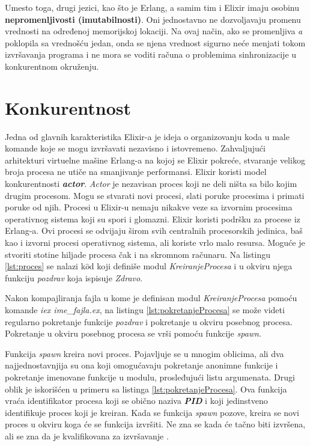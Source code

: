 \documentclass[12pt,oneside]{memoir}
\begin{document}
Umesto toga, drugi jezici, kao što je Erlang, a samim tim i Elixir imaju osobinu \textbf{nepromenljivosti (imutabilnosti)}. Oni jednostavno ne dozvoljavaju promenu vrednosti na određenoj memorijskoj lokaciji. Na ovaj način, ako se promenljiva \textit{a} poklopila sa vrednošću jedan, onda se njena vrednost sigurno neće menjati tokom izvršavanja programa i ne mora se voditi računa o problemima sinhronizacije u konkurentnom okruženju.

\section{Konkurentnost}

Jedna od glavnih karakteristika Elixir-a je ideja o organizovanju koda u male komande koje se mogu izvršavati nezavisno i istovremeno. Zahvaljujući arhitekturi virtuelne mašine Erlang-a na kojoj se Elixir pokreće, stvaranje velikog broja procesa ne utiče na smanjivanje performansi. Elixir koristi model konkurentnosti \textit{\textbf{actor}}. \textit{Actor} je nezavisan proces koji ne deli ništa sa bilo kojim drugim procesom. Mogu se stvarati novi procesi, slati poruke procesima i primati poruke od njih. Procesi u Elixir-u nemaju nikakve veze sa izvornim procesima operativnog sistema koji su spori i glomazni. Elixir koristi podršku za procese iz Erlang-a. Ovi procesi se odvijaju širom svih centralnih procesorskih jedinica, baš kao i izvorni procesi operativnog sistema, ali koriste vrlo malo resursa. Moguće je stvoriti stotine hiljade procesa čak i na skromnom računaru. Na listingu \ref{lst:proces} se nalazi k$\hat{o}$d koji definiše modul \textit{KreiranjeProcesa} i u okviru njega funkciju \textit{pozdrav} koja ispisuje \textit{Zdravo}.



\noindent Nakon kompajliranja fajla u kome je definisan modul \textit{KreiranjeProcesa} pomoću komande \textit{iex ime\_fajla.ex}, na listingu \ref{lst:pokretanjeProcesa} se može videti regularno pokretanje funkcije \textit{pozdrav} i pokretanje u okviru posebnog procesa. Pokretanje u okviru posebnog procesa se vrši pomoću funkcije \textit{spawn}.



Funkcija \textit{spawn} kreira novi proces. Pojavljuje se u mnogim oblicima, ali dva najjednostavnjija su ona koji omogućavaju pokretanje anonimne funkcije i pokretanje imenovane funkcije u modulu, prosleđujući listu argumenata. Drugi oblik je iskorišćen u primeru sa listinga \ref{lst:pokretanjeProcesa}. Ova funkcija vraća identifikator procesa koji se obično naziva \textit{\textbf{PID}} i koji jedinstveno identifikuje proces koji je kreiran. Kada se funkcija \textit{spawn} pozove, kreira se novi proces u okviru koga će se funkcija izvršiti. Ne zna se kada će tačno biti izvršena, ali se zna da je kvalifikovana za izvršavanje \cite{ProgrammingElixir}.
\end{document}
